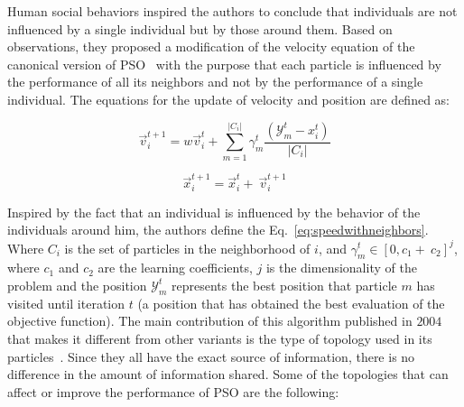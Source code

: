 Human social behaviors inspired the authors to conclude that individuals are not influenced by a single individual but by those around them. Based on observations, they proposed a modification of the velocity equation of the canonical version of PSO~\cite{kennedy1995particle} with the purpose that each particle is influenced by the performance of all its neighbors and not by the performance of a single individual. The equations for the update of velocity and position are defined as: 

\begin{equation}\label{eq:speedwithneighbors}
      \vec{v}_i^{t+1}=w\vec{v}_i^t+\sum_{m=1}^{\left|C_i\right|}{\gamma_m^t\frac{(\mathcal{Y}_m^t-x_i^t)}{\left|C_i\right|}}
\end{equation}

\begin{equation}
       \vec{x}_i^{t+1}=\vec{x}_i^t +\ \vec{v}_i^{t+1}
\end{equation}


Inspired by the fact that an individual is influenced by the behavior of the individuals around him, the authors define the Eq.~\ref{eq:speedwithneighbors}. Where $C_i$ is the set of particles in the neighborhood of $i$, and $\gamma_m^t \in [0, c_1+\ c_2]^j$, where $c_1$ and $c_2$ are the learning coefficients, $j$ is the dimensionality of the problem and the position $\mathcal{Y}_m^t$ represents the best position that particle $m$ has visited until iteration $t$ (a position that has obtained the best evaluation of the objective function).
The main contribution of this algorithm published in $2004$ that makes it different from other variants is the type of topology used in its particles~\cite{mendes2004population}. Since they all have the exact source of information, there is no difference in the amount of information shared. Some of the topologies that can affect or improve the performance of PSO are the following:

